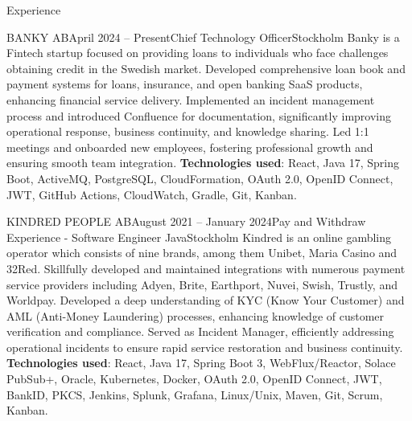 \documentclass{resume}
\begin{document}
  \begin{rSection}{Experience}
    \begin{rSubsection}{BANKY AB}{April 2024 -- Present}{Chief Technology Officer}{Stockholm}
      \bItem Banky is a Fintech startup focused on providing loans to individuals who face challenges obtaining credit in the Swedish market.
      \bItem Developed comprehensive loan book and payment systems for loans, insurance, and open banking SaaS products, enhancing financial service delivery.
      \bItem Implemented an incident management process and introduced Confluence for documentation, significantly improving operational response, business continuity, and knowledge sharing.
      \bItem Led 1:1 meetings and onboarded new employees, fostering professional growth and ensuring smooth team integration.
      \bItem \textbf{Technologies used}: React, Java 17, Spring Boot, ActiveMQ, PostgreSQL, CloudFormation, OAuth 2.0, OpenID Connect, JWT, GitHub Actions, CloudWatch, Gradle, Git, Kanban.
    \end{rSubsection}

    \begin{rSubsection}{KINDRED PEOPLE AB}{August 2021 -- January 2024}{Pay and Withdraw Experience - Software Engineer Java}{Stockholm}
      \bItem Kindred is an online gambling operator which consists of nine brands, among them Unibet, Maria Casino and 32Red.
      \bItem Skillfully developed and maintained integrations with numerous payment service providers including Adyen, Brite, Earthport, Nuvei, Swish, Trustly, and Worldpay.
      \bItem Developed a deep understanding of KYC (Know Your Customer) and AML (Anti-Money Laundering) processes, enhancing knowledge of customer verification and compliance.
      \bItem Served as Incident Manager, efficiently addressing operational incidents to ensure rapid service restoration and business continuity.
      \bItem \textbf{Technologies used}: React, Java 17, Spring Boot 3, WebFlux/Reactor, Solace PubSub+, Oracle, Kubernetes, Docker, OAuth 2.0, OpenID Connect, JWT, BankID, PKCS, Jenkins, Splunk, Grafana, Linux/Unix, Maven, Git, Scrum, Kanban.
    \end{rSubsection}


\end{rSection}
\end{document}
